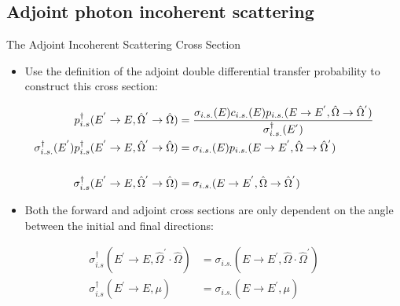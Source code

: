 \documentclass{beamer}
\begin{document}
\subsection{Adjoint photon incoherent scattering}
\begin{frame}{The Adjoint Incoherent Scattering Cross Section}
  
  \begin{itemize}
    \item Use the definition of the adjoint double differential transfer 
      probability to construct this cross section:
  \end{itemize}
  \begin{align}
    p_{i.s}^{\dagger}(E^{'} \to E, \hat{\Omega}^{'} \to \hat{\Omega}) & =
    \frac{\sigma_{i.s.}(E)c_{i.s.}(E)
      p_{i.s.}(E \to E^{'},\hat{\Omega} \to \hat{\Omega}^{'})}
         {\sigma_{i.s.}^{\dagger}(E^{'})} \nonumber \\
         \sigma_{i.s.}^{\dagger}(E^{'})
         p_{i.s}^{\dagger}(E^{'} \to E, \hat{\Omega}^{'} \to \hat{\Omega}) & = 
         \sigma_{i.s.}(E)p_{i.s.}(E \to E^{'},\hat{\Omega} \to \hat{\Omega}^{'})
         \nonumber \\ \medskip \nonumber \\
         \sigma_{i.s}^{\dagger}(E^{'} \to E, \hat{\Omega}^{'} \to \hat{\Omega}) & = 
         \sigma_{i.s.}(E \to E^{'},\hat{\Omega} \to \hat{\Omega}^{'}) \nonumber
  \end{align}

  \begin{itemize}
    \item Both the forward and adjoint cross sections are only dependent on the 
      angle between the initial and final directions:
  \end{itemize}
  \begin{align}
    \sigma_{i.s}^{\dagger}(E^{'} \to E, \hat{\Omega}^{'} \cdot \hat{\Omega}) & = 
    \sigma_{i.s.}(E \to E^{'},\hat{\Omega} \cdot \hat{\Omega}^{'}) \nonumber \\
    \sigma_{i.s}^{\dagger}(E^{'} \to E, \mu) & = 
    \sigma_{i.s.}(E \to E^{'}, \mu) \nonumber
  \end{align}

\end{frame}
\end{document}
